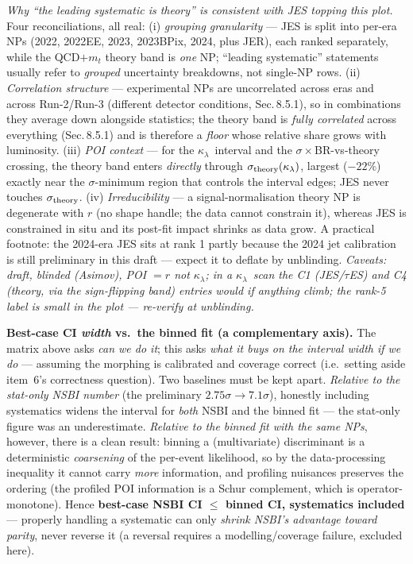 \documentclass[11pt]{article}
\newcommand{\kl}{\ensuremath{\kappa_\lambda}}
\begin{document}
\smallskip\noindent\emph{Why ``the leading systematic is theory'' is consistent with JES topping this plot.}
Four reconciliations, all real: (i) \emph{grouping granularity} --- JES is split into per-era NPs (2022, 2022EE,
2023, 2023BPix, 2024, plus JER), each ranked separately, while the QCD$+m_t$ theory band is \emph{one} NP;
``leading systematic'' statements usually refer to \emph{grouped} uncertainty breakdowns, not single-NP rows.
(ii) \emph{Correlation structure} --- experimental NPs are uncorrelated across eras and across Run-2/Run-3
(different detector conditions, Sec.\,8.5.1), so in combinations they average down alongside statistics; the
theory band is \emph{fully correlated} across everything (Sec.\,8.5.1) and is therefore a \emph{floor} whose
relative share grows with luminosity. (iii) \emph{POI context} --- for the \kl\ interval and the
$\sigma\times$BR-vs-theory crossing, the theory band enters \emph{directly} through $\sigma_{\rm theory}(\kl)$,
largest ($-22\%$) exactly near the $\sigma$-minimum region that controls the interval edges; JES never touches
$\sigma_{\rm theory}$. (iv) \emph{Irreducibility} --- a signal-normalisation theory NP is degenerate with $r$
(no shape handle; the data cannot constrain it), whereas JES is constrained in situ and its post-fit impact
shrinks as data grow. A practical footnote: the 2024-era JES sits at rank 1 partly because the 2024 jet
calibration is still preliminary in this draft --- expect it to deflate by unblinding. \emph{Caveats: draft,
blinded (Asimov), POI $=r$ not \kl; in a \kl\ scan the C1 (JES/$\tau$ES) and C4 (theory, via the sign-flipping
band) entries would if anything climb; the rank-5 label is small in the plot --- re-verify at unblinding.}

\medskip\noindent\textbf{Best-case CI \emph{width} vs.\ the binned fit (a complementary axis).} The matrix above
asks \emph{can we do it}; this asks \emph{what it buys on the interval width if we do} --- assuming the morphing is
calibrated and coverage correct (i.e.\ setting aside item~6's correctness question). Two baselines must be kept
apart. \emph{Relative to the stat-only NSBI number} (the preliminary $2.75\sigma\!\to\!7.1\sigma$), honestly
including systematics widens the interval for \emph{both} NSBI and the binned fit --- the stat-only figure was an
underestimate. \emph{Relative to the binned fit with the same NPs}, however, there is a clean result: binning a
(multivariate) discriminant is a deterministic \emph{coarsening} of the per-event likelihood, so by the
data-processing inequality it cannot carry \emph{more} information, and profiling nuisances preserves the ordering
(the profiled POI information is a Schur complement, which is operator-monotone). Hence \textbf{best-case NSBI
CI $\le$ binned CI, systematics included} --- properly handling a systematic can only \emph{shrink NSBI's advantage
toward parity}, never reverse it (a reversal requires a modelling/coverage failure, excluded here).
\end{document}
